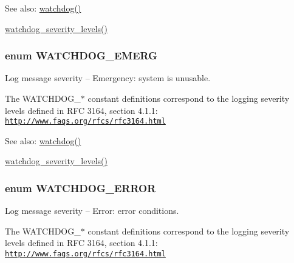 \begin{Desc}
\item[See also:]\hyperlink{bootstrap_8inc_cb7338e6740302727043d64e3ae1257b}{watchdog()} 

\hyperlink{common_8inc_fb5d4b58ec7e483153644c0f664e0ca4}{watchdog\_\-severity\_\-levels()} \end{Desc}
\hypertarget{bootstrap_8inc_878c4376d15611196e4a5f50e8287084}{
\subsubsection[{WATCHDOG\_\-EMERG}]{\setlength{\rightskip}{0pt plus 5cm}enum {\bf WATCHDOG\_\-EMERG}}}
\label{bootstrap_8inc_878c4376d15611196e4a5f50e8287084}


Log message severity -- Emergency: system is unusable.

The WATCHDOG\_\-$\ast$ constant definitions correspond to the logging severity levels defined in RFC 3164, section 4.1.1: \href{http://www.faqs.org/rfcs/rfc3164.html}{\tt http://www.faqs.org/rfcs/rfc3164.html}

\begin{Desc}
\item[See also:]\hyperlink{bootstrap_8inc_cb7338e6740302727043d64e3ae1257b}{watchdog()} 

\hyperlink{common_8inc_fb5d4b58ec7e483153644c0f664e0ca4}{watchdog\_\-severity\_\-levels()} \end{Desc}
\hypertarget{bootstrap_8inc_174c9df2936096e11986fcf184d48576}{
\subsubsection[{WATCHDOG\_\-ERROR}]{\setlength{\rightskip}{0pt plus 5cm}enum {\bf WATCHDOG\_\-ERROR}}}
\label{bootstrap_8inc_174c9df2936096e11986fcf184d48576}


Log message severity -- Error: error conditions.

The WATCHDOG\_\-$\ast$ constant definitions correspond to the logging severity levels defined in RFC 3164, section 4.1.1: \href{http://www.faqs.org/rfcs/rfc3164.html}{\tt http://www.faqs.org/rfcs/rfc3164.html}

